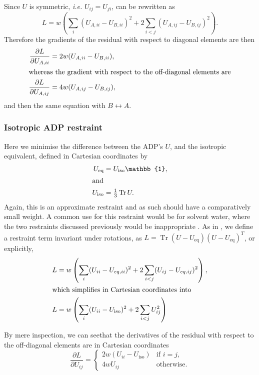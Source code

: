 \documentclass[pdf]{iucr}
\newcommand{\mat}[1]{#1}
\newcommand{\identity}{\mathbb{1}}
\newcommand{\tr}{\operatorname{Tr}}
\newcommand{\partialder}[2]{\frac{\partial #1}{\partial #2}}
\begin{document}
Since $\mat{U}$ is symmetric, \emph{i.e.} $U_{ij} = U_{ji}$,  can be rewritten as
\begin{equation}
L = w \left( \sum_i (U_{A,ii} - U_{B,ii})^2 + 2 \sum_{i < j} (U_{A,ij} - U_{B,ij})^2 \right) .
\end{equation}
Therefore the gradients of the residual with respect to diagonal elements are then
\begin{align}
\partialder{L}{U_{A,ii}} &= 2w(U_{A,ii} - U_{B,ii}),\\
\shortintertext{whereas the gradient with respect to the off-diagonal elements are}
\partialder{L}{U_{A,ij}} &=  4w(U_{A,ij} - U_{B,ij}),
\end{align}
and then the same equation with $B \leftrightarrow A$.

\subsubsection{Isotropic ADP restraint}
Here we minimise the difference between the ADP's $\mat{U}$, and the isotropic equivalent, defined in Cartesian coordinates by
\begin{align}
\mat{U}_\text{eq} &= U_\text{iso}\identity, \\
\shortintertext{and}
U_\text{iso} &= \tfrac{1}{3} \tr \mat{U}.
\end{align}
Again, this is an approximate restraint and as such should have a comparatively small weight. A common use for this restraint would be for solvent water, where the two restraints discussed previously would be inappropriate . As in , we define a restraint term invariant under rotations, as $L = \tr (U-U_\text{eq})(U-U_\text{eq})^T$, or explicitly,
\begin{align}
\label{eqn:ADP:restraints:isotropic}
L &= w \left( \sum_i (U_{ii} - U_{eq,ii})^2 + 2 \sum_{i<j} (U_{ij}-U_{eq,ij})^2 \right),\\
\shortintertext{which simplifies in Cartesian coordinates into}
L &= w \left( \sum_i (U_{ii} - U_\text{iso})^2 + 2 \sum_{i<j} U_{ij}^2 \right)
\end{align}

By mere inspection, we can seethat the derivatives of the residual with respect to the off-diagonal elements are in Cartesian coordinates
\begin{equation}
\partialder{L}{U_{ij}} = \begin{cases}
 2 w (U_{ii} - U_\text{iso}) & \text{if $i=j$,}\\
 4 w U_{ij} & \text{otherwise}.
 \end{cases}
\end{equation}
\end{document}
